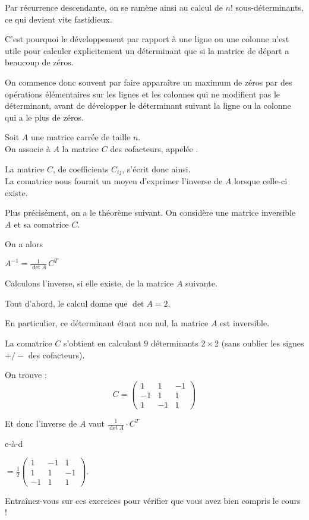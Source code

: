 \change
Par récurrence descendante, on se ramène ainsi au calcul de $n!$ sous-déterminants, ce qui devient vite fastidieux.

\change
C'est pourquoi le développement par rapport à une ligne ou une
colonne  n'est utile pour calculer explicitement un déterminant que
si la matrice de départ a beaucoup de zéros.

\change 
On commence donc souvent par faire apparaître
un maximum de zéros par des opérations élémentaires sur les lignes et les colonnes
qui ne modifient pas le déterminant, avant de développer le déterminant suivant la ligne ou la colonne qui a le plus de zéros.


\diapo

Soit $A$ une matrice carrée de taille $n$. \\

On associe à $A$ la matrice $C$ des cofacteurs, appelée .

\change
La matrice $C$, de coefficients $C_{ij}$, s'écrit donc ainsi. \\

La comatrice nous fournit un moyen d'exprimer l'inverse de $A$ lorsque celle-ci existe.

\change
Plus précisément, on a le théorème suivant. On considère une matrice inversible $A$ et sa comatrice $C$. 

\change
On a alors

$\displaystyle A^{-1} = \frac{1}{\det A} \, C^T$

\diapo
Calculons l'inverse, si elle existe, de la matrice $A$ suivante.

\change
Tout d'abord, le calcul donne que $\det A = 2$. 

\change
En particulier, ce déterminant étant non nul, la matrice $A$ est inversible.

\change
La comatrice $C$ 
s'obtient en calculant $9$ déterminants
$2\times 2$ (sans oublier les signes $+/-$ des cofacteurs). 

\change
On trouve :
$$C = \begin{pmatrix}
1 & 1 & -1\\
-1 & 1 & 1\\
1 & -1 & 1        
      \end{pmatrix}
$$


\change
Et donc l'inverse de $A$ vaut
$\frac{1}{\det A} \cdot C^T$

\change
c-à-d 

$
 = \frac{1}{2}
\begin{pmatrix}
1 & -1 & 1\\
1 & 1 & -1\\
-1 & 1 & 1  
\end{pmatrix}
$.

\diapo
Entraînez-vous sur ces exercices pour vérifier que vous avez bien compris le cours !



